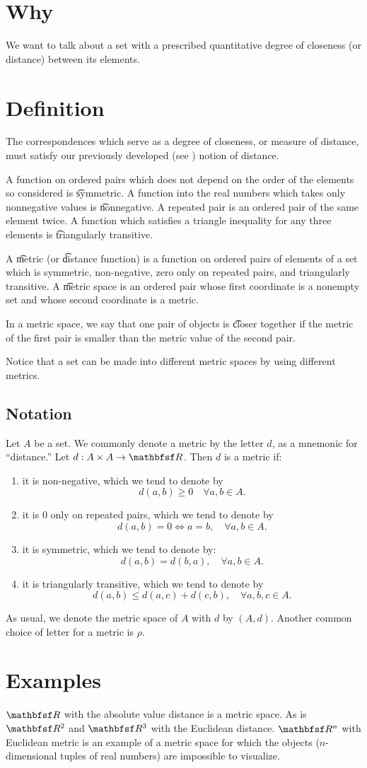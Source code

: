 
\section*{Why}

We want to talk about a set with a prescribed quantitative degree of closeness (or distance) between its elements.

\section*{Definition}

The correspondences which serve as a degree of closeness, or measure of distance, must satisfy our previously developed (see ) notion of distance.

A function on ordered pairs which does not depend on the order of the elements so considered is \t{symmetric}.
A function into the real numbers which takes only nonnegative values is \t{nonnegative}.
A repeated pair is an ordered pair of the same element twice.
A function which satisfies a triangle inequality for any three elements is \t{triangularly transitive}.

A \t{metric} (or \t{distance function}) is a function on ordered pairs of elements of a set which is symmetric, non-negative, zero only on repeated pairs, and triangularly transitive.
A \t{metric space} is an ordered pair whose first coordinate is a nonempty set and whose second coordinate is a metric.

In a metric space, we say that one pair of objects is \t{closer} together if the metric of the first pair is smaller than the metric value of the second pair.

Notice that a set can be made into different metric spaces by using different metrics.

\subsection*{Notation}

Let $A$ be a set.
We commonly denote a metric by the letter $d$, as a mnemonic for ``distance.''
Let $d: A \times  A \to \R $.
Then $d$ is a metric if:
    \begin{enumerate}
      \item it is non-negative, which we tend to denote by
\[
d(a, b) \geq 0 \quad \forall a,b \in A.
\]
      \item it is $0$ only on repeated pairs, which we tend to denote by
\[
d(a, b) = 0 \iff a = b, \quad \forall a,b \in A.
\]
      \item it is symmetric, which we tend to denote by:
\[
d(a, b) = d(b, a), \quad \forall a,b \in A.
\]
      \item it is triangularly transitive, which we tend to denote by
\[
d(a, b) \leq d(a, c) + d(c, b), \quad \forall a,b,c \in A.
\]
    \end{enumerate}
As usual, we denote the metric space of $A$ with $d$ by $(A, d)$.
Another common choice of letter for a metric is $\rho $.

\section*{Examples}

$\R $ with the absolute value distance is a metric space.
As is $\R ^2$ and $\R ^3$ with the Euclidean distance.
$\R ^n$ with Euclidean metric is an example of a metric space for which the objects ($n$-dimensional tuples of real numbers) are impossible to visualize.
